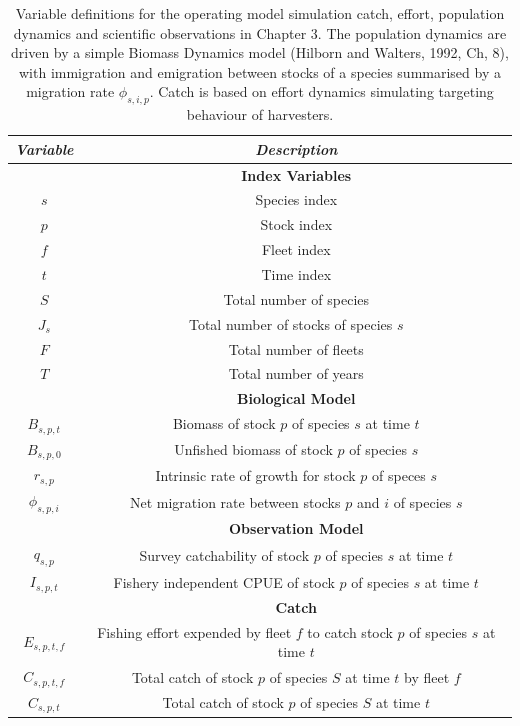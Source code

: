 \documentclass[]{scrartcl}
\begin{document}
\newpage

\begin{table}[htbp]
\begin{center}
\caption{Variable definitions for the operating model simulation catch, effort, population dynamics and scientific observations in Chapter 3. The population dynamics are driven by a simple Biomass Dynamics model (Hilborn and Walters, 1992, Ch, 8), with immigration and emigration between stocks of a species summarised by a migration rate $\phi_{s,i,p}$. Catch is based on effort dynamics simulating targeting behaviour of harvesters.}\label{tab:OMspec}
\begin{tabular}{c|c}
\textit{Variable} & \textit{Description}  \\
\hline
& \textbf{ Index Variables} \\
\hline
$s$ & Species index \\
$p$ & Stock index \\
$f$ & Fleet index \\
$t$ & Time index \\
$S$ & Total number of species \\
$J_s$ & Total number of stocks of species $s$ \\
$F$ & Total number of fleets \\
$T$ & Total number of years \\
\hline
& \textbf{ Biological Model} \\
\hline
$B_{s,p,t}$ & Biomass of stock $p$ of species $s$ at time $t$ \\
$B_{s,p,0}$ & Unfished biomass of stock $p$ of species $s$ \\
$r_{s,p}$ & Intrinsic rate of growth for stock $p$ of speces $s$ \\
$\phi_{s,p,i}$ &  Net migration rate between stocks $p$ and $i$ of species $s$ \\
\hline
& \textbf{ Observation Model} \\
\hline
$q_{s,p}$ & Survey catchability of stock $p$ of species $s$ at time $t$ \\
$I_{s,p,t}$ & Fishery independent CPUE of stock $p$ of species $s$ at time $t$ \\
\hline
& \textbf{ Catch} \\
\hline
$E_{s,p,t,f}$ & Fishing effort expended by fleet $f$ to catch stock $p$ of species $s$ at time $t$ \\
$C_{s,p,t,f}$ & Total catch of stock $p$ of species $S$ at time $t$ by fleet $f$ \\
$C_{s,p,t}$ & Total catch of stock $p$ of species $S$ at time $t$ \\

\end{tabular}
\end{center}
\end{table}
\end{document}
